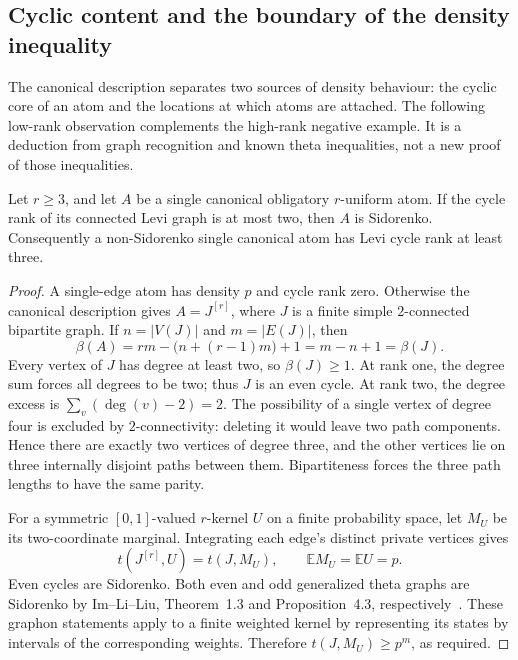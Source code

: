 
\subsection{Cyclic content and the boundary of the density inequality}

The canonical description separates two sources of density behaviour: the
cyclic core of an atom and the locations at which atoms are attached.  The
following low-rank observation complements the high-rank negative example.
It is a deduction from graph recognition and known theta inequalities,
not a new proof of those inequalities.

\begin{proposition}
\label{density-low-rank-atom-boundary}
Let $r\ge3$, and let $A$ be a single canonical obligatory $r$-uniform atom.
If the cycle rank of its connected Levi graph is at most two, then $A$ is
Sidorenko.  Consequently a non-Sidorenko single canonical atom has Levi
cycle rank at least three.
\end{proposition}
\begin{proof}
A single-edge atom has density $p$ and cycle rank zero.  Otherwise the
canonical description gives $A=J^{[r]}$, where $J$ is a finite simple
$2$-connected bipartite graph.  If $n=|V(J)|$ and $m=|E(J)|$, then
\[
 \beta(A)=rm-\bigl(n+(r-1)m\bigr)+1=m-n+1=\beta(J).
\]
Every vertex of $J$ has degree at least two, so $\beta(J)\ge1$.
At rank one, the degree sum forces all degrees to be two; thus $J$ is an
even cycle.  At rank two, the degree excess is
$\sum_v(\deg(v)-2)=2$.  The possibility of a single vertex of degree four
is excluded by $2$-connectivity: deleting it would leave two path
components.  Hence there are exactly two vertices of degree three, and
the other vertices lie on three internally disjoint paths between them.
Bipartiteness forces the three path lengths to have the same parity.

For a symmetric $[0,1]$-valued $r$-kernel $U$ on a finite probability
space, let $M_U$ be its two-coordinate marginal.  Integrating each
edge's distinct private vertices gives
\[
 t(J^{[r]},U)=t(J,M_U),\qquad \mathbb E M_U=\mathbb E U=p.
\]
Even cycles are Sidorenko.  Both even and odd generalized theta graphs
are Sidorenko by Im--Li--Liu, Theorem~1.3 and Proposition~4.3,
respectively~\citep{imliliu2024}.  These graphon statements apply to a
finite weighted kernel by representing its states by intervals of the
corresponding weights.  Therefore $t(J,M_U)\ge p^m$, as required.
\end{proof}

